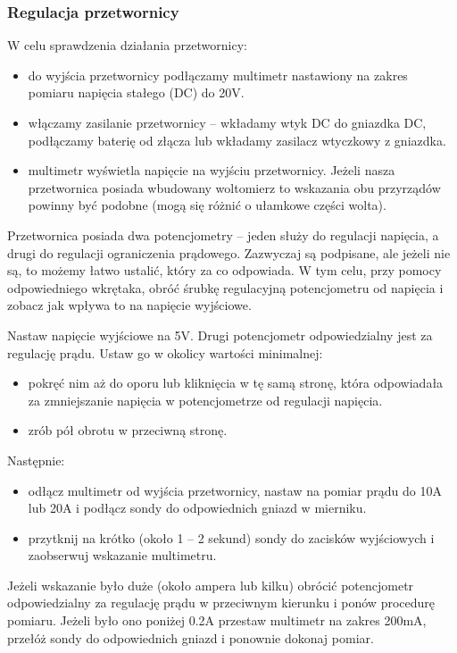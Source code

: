 \documentclass{pdfBooklets}
\begin{document}
\subsubsection{Regulacja przetwornicy}

W celu sprawdzenia działania przetwornicy:
\begin{itemize}
	\item do wyjścia przetwornicy podłączamy multimetr nastawiony na zakres pomiaru napięcia stałego (DC) do 20V.
	\item włączamy zasilanie przetwornicy – wkładamy wtyk DC do gniazdka DC, podłączamy baterię od złącza lub wkładamy zasilacz wtyczkowy z gniazdka.
	\item multimetr wyświetla napięcie na wyjściu przetwornicy. Jeżeli nasza przetwornica posiada wbudowany woltomierz to wskazania obu przyrządów powinny być podobne (mogą się różnić o ułamkowe części wolta).
\end{itemize}
\vspace*{\baselineskip}


Przetwornica posiada dwa potencjometry – jeden służy do regulacji napięcia, a drugi do regulacji ograniczenia prądowego. Zazwyczaj są podpisane, ale jeżeli nie są, to możemy łatwo ustalić, który za co odpowiada.
W tym celu, przy pomocy odpowiedniego wkrętaka, obróć śrubkę regulacyjną potencjometru od napięcia i zobacz jak wpływa to na napięcie wyjściowe.

Nastaw napięcie wyjściowe na 5V. Drugi potencjometr odpowiedzialny jest za regulację prądu. Ustaw go w okolicy wartości minimalnej:
\begin{itemize}
	\item pokręć nim aż do oporu lub kliknięcia w tę samą stronę, która odpowiadała za zmniejszanie napięcia w potencjometrze od regulacji napięcia.
	\item zrób pół obrotu w przeciwną stronę.
\end{itemize}
Następnie:
\begin{itemize}
	\item odłącz multimetr od wyjścia przetwornicy, nastaw na pomiar prądu do 10A lub 20A i podłącz sondy do odpowiednich gniazd w mierniku.
	\item przytknij na krótko (około 1 – 2 sekund) sondy do zacisków wyjściowych i zaobserwuj wskazanie multimetru.
\end{itemize}
Jeżeli wskazanie było duże (około ampera lub kilku) obrócić potencjometr odpowiedzialny za regulację prądu w przeciwnym kierunku i ponów procedurę pomiaru.
Jeżeli było ono poniżej 0.2A przestaw multimetr na zakres 200mA, przełóż sondy do odpowiednich gniazd i ponownie dokonaj pomiar.
\end{document}
